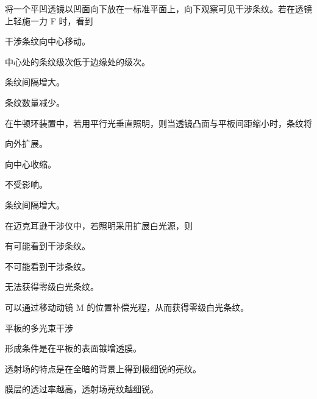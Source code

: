 \documentclass[standard, analysis, notocnum]{ExBook}
\newcommand{\answerarea}[1][8cm]{%
  \par\vspace{2mm}%
  \noindent{\color{themeColor!35}\rule{\linewidth}{0.4pt}}\par
  \noindent\begin{minipage}[t][#1][t]{\linewidth}\vspace{0pt}\end{minipage}\par
  \noindent{\color{themeColor!35}\rule{\linewidth}{0.4pt}}\par
}
\begin{document}
\begin{qitems}
\begin{bbox}
\qitem 将一个平凹透镜以凹面向下放在一标准平面上，向下观察可见干涉条纹。若在透镜上轻施一力 F 时，看到
\par\noindent\hspace{2em}干涉条纹向中心移动。
\par\noindent\hspace{2em}中心处的条纹级次低于边缘处的级次。
\par\noindent\hspace{2em}条纹间隔增大。
\par\noindent\hspace{2em}条纹数量减少。
\answerarea[3.5cm]
\end{bbox}
\begin{bbox}
\qitem 在牛顿环装置中，若用平行光垂直照明，则当透镜凸面与平板间距缩小时，条纹将
\par\noindent\hspace{2em}向外扩展。
\par\noindent\hspace{2em}向中心收缩。
\par\noindent\hspace{2em}不受影响。
\par\noindent\hspace{2em}条纹间隔增大。
\answerarea[3.5cm]
\end{bbox}
\begin{bbox}
\qitem 在迈克耳逊干涉仪中，若照明采用扩展白光源，则
\par\noindent\hspace{2em}有可能看到干涉条纹。
\par\noindent\hspace{2em}不可能看到干涉条纹。
\par\noindent\hspace{2em}无法获得零级白光条纹。
\par\noindent\hspace{2em}可以通过移动动镜 M 的位置补偿光程，从而获得零级白光条纹。
\answerarea[3.5cm]
\end{bbox}
\begin{bbox}
\qitem 平板的多光束干涉
\par\noindent\hspace{2em}形成条件是在平板的表面镀增透膜。
\par\noindent\hspace{2em}透射场的特点是在全暗的背景上得到极细锐的亮纹。
\par\noindent\hspace{2em}膜层的透过率越高，透射场亮纹越细锐。

\end{bbox}
\end{qitems}
\end{document}
